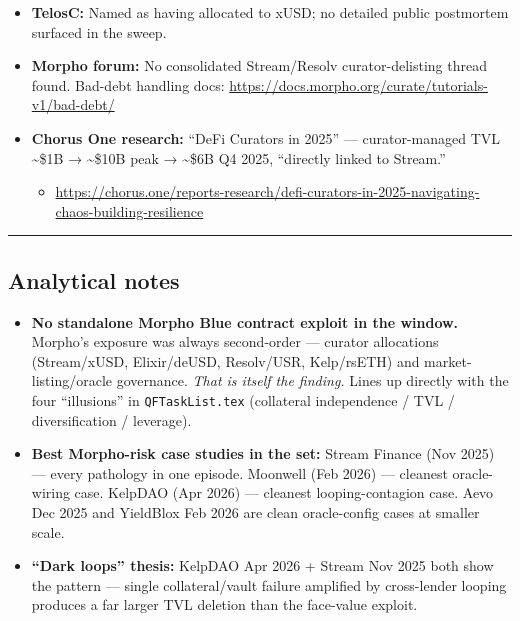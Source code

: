 \begin{itemize}
  \begin{itemize}
  \tightlist
  \item
    \url{https://x.com/SteakhouseFi/status/1998751204491313178}
  \end{itemize}
\item
  \textbf{TelosC:} Named as having allocated to xUSD; no detailed public postmortem surfaced in the sweep.
\item
  \textbf{Morpho forum:} No consolidated Stream/Resolv curator-delisting thread found. Bad-debt handling docs: \url{https://docs.morpho.org/curate/tutorials-v1/bad-debt/}
\item
  \textbf{Chorus One research:} ``DeFi Curators in 2025'' --- curator-managed TVL \textasciitilde\$1B → \textasciitilde\$10B peak → \textasciitilde\$6B Q4 2025, ``directly linked to Stream.''

  \begin{itemize}
  \tightlist
  \item
    \url{https://chorus.one/reports-research/defi-curators-in-2025-navigating-chaos-building-resilience}
  \end{itemize}
\end{itemize}

\begin{center}\rule{0.5\linewidth}{0.5pt}\end{center}

\subsection{Analytical notes}\label{analytical-notes}

\begin{itemize}
\tightlist
\item
  \textbf{No standalone Morpho Blue contract exploit in the window.} Morpho's exposure was always second-order --- curator allocations (Stream/xUSD, Elixir/deUSD, Resolv/USR, Kelp/rsETH) and market-listing/oracle governance. \emph{That is itself the finding.} Lines up directly with the four ``illusions'' in \texttt{QFTaskList.tex} (collateral independence / TVL / diversification / leverage).
\item
  \textbf{Best Morpho-risk case studies in the set:} Stream Finance (Nov 2025) --- every pathology in one episode. Moonwell (Feb 2026) --- cleanest oracle-wiring case. KelpDAO (Apr 2026) --- cleanest looping-contagion case. Aevo Dec 2025 and YieldBlox Feb 2026 are clean oracle-config cases at smaller scale.
\item
  \textbf{``Dark loops'' thesis:} KelpDAO Apr 2026 + Stream Nov 2025 both show the pattern --- single collateral/vault failure amplified by cross-lender looping produces a far larger TVL deletion than the face-value exploit.
\end{itemize}

